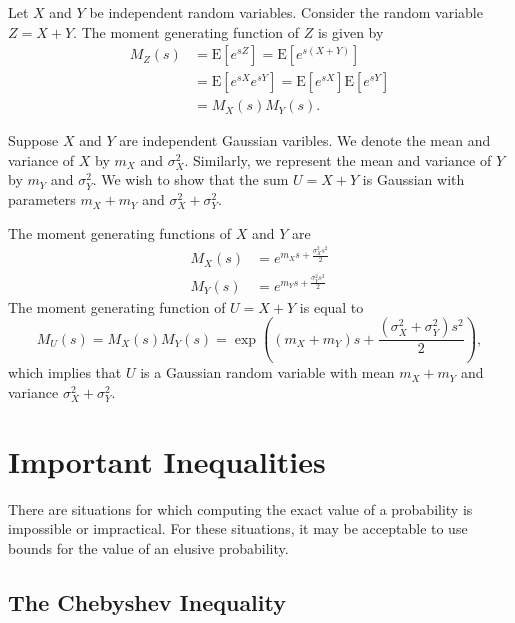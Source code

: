 Let $X$ and $Y$ be independent random variables.
Consider the random variable $Z = X + Y$.
The moment generating function of $Z$ is given by
\begin{equation*}
\begin{split}
M_Z (s) &= \mathrm{E} \left[ e^{sZ} \right]
= \mathrm{E} \left[ e^{s(X + Y)} \right] \\
&= \mathrm{E} \left[ e^{sX} e^{sY} \right]
= \mathrm{E} \left[ e^{sX} \right] \mathrm{E} \left[ e^{sY} \right] \\
&= M_X(s) M_Y(s) .
\end{split}
\end{equation*}

\begin{example}
Suppose $X$ and $Y$ are independent Gaussian varibles.
We denote the mean and variance of $X$ by $m_X$ and $\sigma_X^2$.
Similarly, we represent the mean and variance of $Y$ by $m_Y$ and $\sigma_Y^2$. 
We wish to show that the sum $U = X + Y$ is Gaussian with parameters $m_X + m_Y$ and $\sigma_X^2 + \sigma_Y^2$.

The moment generating functions of $X$ and $Y$ are
\begin{align*}
M_X (s) &= e^{m_X s + \frac{\sigma_X^2 s^2}{2}} \\
M_Y (s) &= e^{m_Y s + \frac{\sigma_Y^2 s^2}{2}}
\end{align*}
The moment generating function of $U = X + Y$ is equal to
\begin{equation*}
M_U (s) = M_X (s) M_Y (s)
= \exp \left( (m_X + m_Y) s + \frac{(\sigma_X^2 + \sigma_Y^2) s^2}{2} \right) ,
\end{equation*}
which implies that $U$ is a Gaussian random variable with mean $m_X + m_Y$ and variance $\sigma_X^2 + \sigma_Y^2$.
\end{example}


\section{Important Inequalities}

There are situations for which computing the exact value of a probability is impossible or impractical.
For these situations, it may be acceptable to use bounds for the value of an elusive probability.


\subsection{The Chebyshev Inequality}

